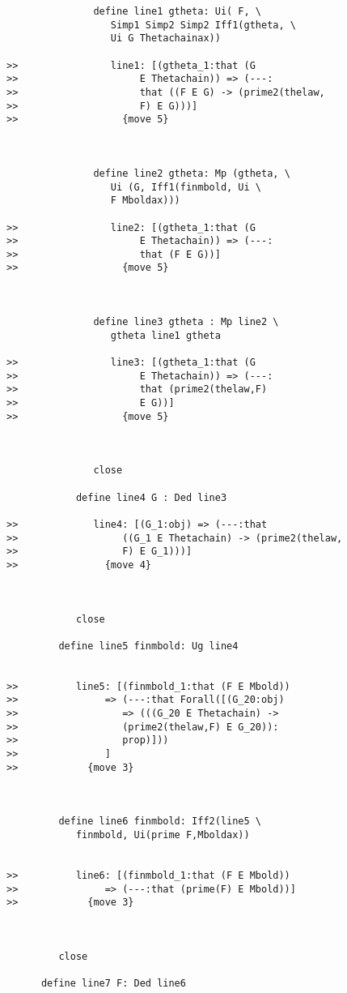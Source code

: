 \documentclass[12pt]{article}
\begin{document}
\begin{verbatim}
               define line1 gtheta: Ui( F, \
                  Simp1 Simp2 Simp2 Iff1(gtheta, \
                  Ui G Thetachainax))

>>                line1: [(gtheta_1:that (G
>>                     E Thetachain)) => (---:
>>                     that ((F E G) -> (prime2(thelaw,
>>                     F) E G)))]
>>                  {move 5}



               define line2 gtheta: Mp (gtheta, \
                  Ui (G, Iff1(finmbold, Ui \
                  F Mboldax)))

>>                line2: [(gtheta_1:that (G
>>                     E Thetachain)) => (---:
>>                     that (F E G))]
>>                  {move 5}



               define line3 gtheta : Mp line2 \
                  gtheta line1 gtheta

>>                line3: [(gtheta_1:that (G
>>                     E Thetachain)) => (---:
>>                     that (prime2(thelaw,F)
>>                     E G))]
>>                  {move 5}



               close

            define line4 G : Ded line3

>>             line4: [(G_1:obj) => (---:that
>>                  ((G_1 E Thetachain) -> (prime2(thelaw,
>>                  F) E G_1)))]
>>               {move 4}



            close

         define line5 finmbold: Ug line4


>>          line5: [(finmbold_1:that (F E Mbold))
>>               => (---:that Forall([(G_20:obj)
>>                  => (((G_20 E Thetachain) ->
>>                  (prime2(thelaw,F) E G_20)):
>>                  prop)]))
>>               ]
>>            {move 3}



         define line6 finmbold: Iff2(line5 \
            finmbold, Ui(prime F,Mboldax))


>>          line6: [(finmbold_1:that (F E Mbold))
>>               => (---:that (prime(F) E Mbold))]
>>            {move 3}



         close

      define line7 F: Ded line6


\end{verbatim}
\end{document}

